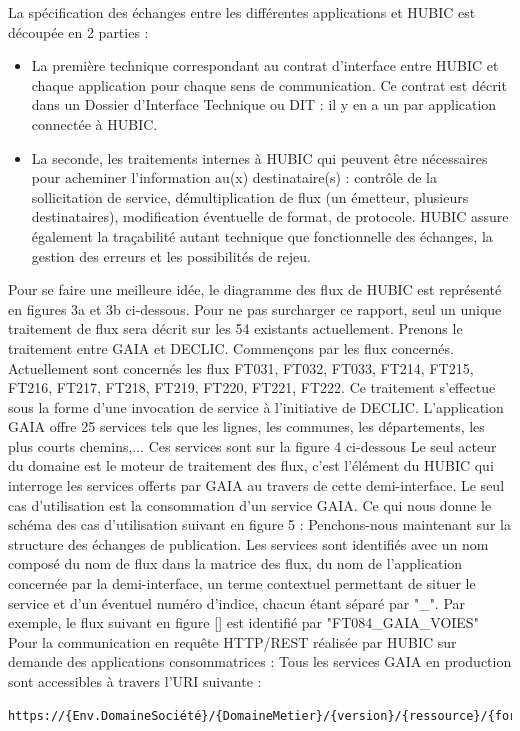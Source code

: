 La spécification des échanges entre les différentes applications et HUBIC est découpée en 2
parties :
\begin{itemize}
\item La première technique correspondant au contrat d'interface entre HUBIC et chaque application
pour chaque sens de communication. Ce contrat est décrit dans un Dossier
d'Interface Technique ou DIT : il y en a un par application connectée à HUBIC.
\item La seconde, les traitements internes à HUBIC qui peuvent être nécessaires pour acheminer
l'information au(x) destinataire(s) : contrôle de la sollicitation de service, démultiplication
de flux (un émetteur, plusieurs destinataires), modification éventuelle de format, de
protocole. HUBIC assure également la traçabilité autant technique que fonctionnelle des
échanges, la gestion des erreurs et les possibilités de rejeu.
\end{itemize}
Pour se faire une meilleure idée, le diagramme des flux de HUBIC est représenté en figures 3a et
3b ci-dessous. Pour ne pas surcharger ce rapport, seul un unique traitement de flux sera décrit
sur les 54 existants actuellement. Prenons le traitement entre GAIA et DECLIC.
Commençons par les flux concernés. Actuellement sont concernés les flux FT031, FT032, FT033,
FT214, FT215, FT216, FT217, FT218, FT219, FT220, FT221, FT222.
Ce traitement s'effectue sous la forme d'une invocation de service à l'initiative de DECLIC.
L'application GAIA offre 25 services tels que les lignes, les communes, les départements, les
plus courts chemins,... Ces services sont sur la figure 4 ci-dessous
Le seul acteur du domaine est le moteur de traitement des flux, c'est l'élément du HUBIC qui
interroge les services offerts par GAIA au travers de cette demi-interface.
Le seul cas d'utilisation est la consommation d'un service GAIA. Ce qui nous donne le schéma
des cas d'utilisation suivant en figure 5 :
Penchons-nous maintenant sur la structure des échanges de publication.
Les services sont identifiés avec un nom composé du nom de flux dans la matrice des flux, du
nom de l'application concernée par la demi-interface, un terme contextuel permettant de situer
le service et d'un éventuel numéro d'indice, chacun étant séparé par "\_". Par exemple, le flux
suivant en figure \ref{} est identifié par "FT084\_GAIA\_VOIES"
Pour la communication en requête HTTP/REST réalisée par HUBIC sur demande des applications consommatrices :
Tous les services GAIA en production sont accessibles à travers l'URI suivante :\begin{verbatim}
https://{Env.DomaineSociété}/{DomaineMetier}/{version}/{ressource}/{format}
\end{verbatim}

